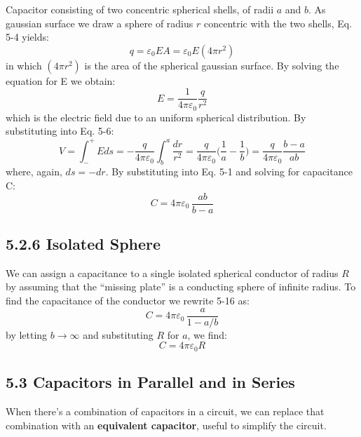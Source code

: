 \documentclass[12pt, a4paper]{article}
\begin{document}
		Capacitor consisting of two concentric spherical shells, of radii $a$ and $b$. As gaussian surface we draw a sphere of radius $r$ concentric with the two shells, Eq. 5-4 yields:
		\begin{equation*}
			q = \varepsilon_0 E A = \varepsilon_0 E (4 \pi r^2)
		\end{equation*}
		in which $(4 \pi r^2)$ is the area of the spherical gaussian surface. By solving the equation for E we obtain:
		\begin{equation*}
			E = \frac{1}{4 \pi \varepsilon_0} \frac{q}{r^2}
			\tag{5-14}
		\end{equation*}
		which is the electric field due to an uniform spherical distribution. By substituting into Eq. 5-6:
		\begin{equation*}
			V = \int_{-}^{+} E ds 
			  = - \frac{q}{4 \pi \varepsilon_0} \int_{b}^{a} \frac{dr}{r^2} 
			  = \frac{q}{4 \pi \varepsilon_0} \biggl( \frac{1}{a} - \frac{1}{b} \biggl)
				  = \frac{q}{4 \pi \varepsilon_0} \frac{b - a}{ab}
			\tag{5-15}
		\end{equation*}		
		where, again, $ds = -dr$. By substituting into Eq. 5-1 and solving for capacitance C:
		\begin{equation*}
			C = 4 \pi \varepsilon_0 \, \frac{ab}{b - a} 
			\tag{Spherical Capacitor, 5-16}
		\end{equation*}
	
	
		
		\subsection*{5.2.6 Isolated Sphere}
		
		We can assign a capacitance to a single isolated spherical conductor of radius $R$
		by assuming that the “missing plate” is a conducting sphere of infinite radius.
		To find the capacitance of the conductor we rewrite 5-16 as:
		\[
			C = 4 \pi \varepsilon_0 \, \frac{a}{1 - a/b}
		\]
		by letting $b \rightarrow \infty$ and substituting $R$ for $a$, we find:
		\[
			C = 4 \pi \varepsilon_0 R
			\tag{Isolated Sphere, 5-17}
		\]
		
		\subsection*{5.3 Capacitors in Parallel and in Series}
		
		When there's a combination of capacitors in a circuit, we can replace that combination with an \textbf{equivalent capacitor}, useful to simplify the circuit.
		
\end{document}
